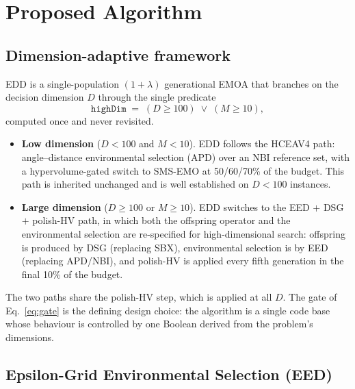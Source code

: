 \documentclass[preprint,12pt]{elsarticle}
\begin{document}
\section{Proposed Algorithm}
\label{sec:method}

\subsection{Dimension-adaptive framework}

EDD is a single-population $(1+\lambda)$ generational EMOA that branches on
the decision dimension $D$ through the single predicate
\begin{equation}
\texttt{highDim} \;=\; (D \ge 100) \;\lor\; (M \ge 10),
\label{eq:gate}
\end{equation}
computed once and never revisited.

\begin{itemize}
\item \textbf{Low dimension} ($D < 100$ and $M < 10$). EDD follows the
HCEAV4 path: angle--distance environmental selection (APD) over an NBI
reference set, with a hypervolume-gated switch to SMS-EMO at 50/60/70\% of
the budget. This path is inherited unchanged and is well established on
$D < 100$ instances.

\item \textbf{Large dimension} ($D \ge 100$ or $M \ge 10$). EDD switches to
the EED $+$ DSG $+$ polish-HV path, in which both the offspring operator and
the environmental selection are re-specified for high-dimensional search:
offspring is produced by DSG (replacing SBX), environmental selection is by
EED (replacing APD/NBI), and polish-HV is applied every fifth generation in
the final 10\% of the budget.
\end{itemize}

The two paths share the polish-HV step, which is applied at all $D$. The gate
of Eq.~\eqref{eq:gate} is the defining design choice: the algorithm is a
single code base whose behaviour is controlled by one Boolean derived from
the problem's dimensions.

\subsection{Epsilon-Grid Environmental Selection (EED)}
\label{sec:eed}
\end{document}
